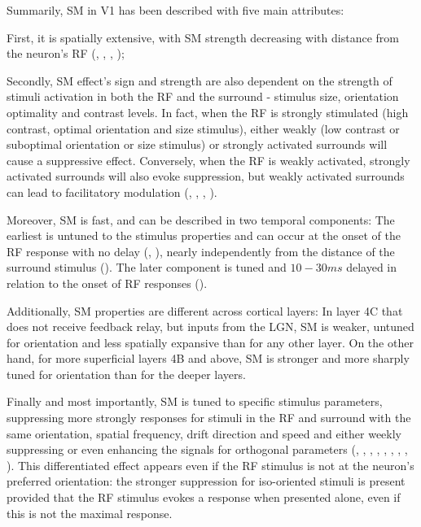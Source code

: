 Summarily, SM in V1 has been described with five main attributes: 

First, it is spatially extensive, with SM strength decreasing with distance from the neuron's RF (\cite{Sceniak2001}, \cite{Cavanaugh2002a}, \cite{Levitt2002}, \cite{Shushruth2009});

Secondly, SM effect's sign and strength are also dependent on the strength of stimuli activation in both the RF and the surround - stimulus size, orientation optimality and contrast levels. In fact, when the RF is strongly stimulated (high contrast, optimal orientation and size stimulus), either weakly (low contrast or suboptimal orientation or size stimulus) or strongly activated surrounds will cause a suppressive effect. Conversely, when the RF is weakly activated, strongly activated surrounds will also evoke suppression, but weakly activated surrounds can lead to facilitatory modulation (\cite{Polat1998}, \cite{Chen2001}, \cite{Ichida2007}, \cite{Shushruth2012}).

Moreover, SM is fast, and can be described in two temporal components: The earliest is untuned to the stimulus properties and can occur at the onset of the RF response with no delay (\cite{Muller2003}, \cite{Henry2013}), nearly independently from the distance of the surround stimulus (\cite{Bair2003}). The later component is tuned and $10-30 ms$ delayed in relation to the onset of RF responses (\cite{Bair2003}).

Additionally, SM properties are different across cortical layers: In layer 4C that does not receive feedback relay, but inputs from the LGN, SM is weaker, untuned for orientation and less spatially expansive than for any other layer. On the other hand, for more superficial layers 4B and above, SM is stronger and more sharply tuned for orientation than for the deeper layers.

Finally and most importantly, SM is tuned to specific stimulus parameters, suppressing more strongly responses for stimuli in the RF and surround with the same orientation, spatial frequency, drift direction and speed and either weekly suppressing or even enhancing the signals for orthogonal parameters (\cite{deAngelis1994}, \cite{Li1994}, \cite{Sengpiel1997}, \cite{Walker1999}, \cite{Cavanaugh2002a}, \cite{Muller2003}, \cite{Webb2005}, \cite{Henry2013}, \cite{Self2014}). This differentiated effect appears even if the RF stimulus is not at the neuron's preferred orientation: the stronger suppression for iso-oriented stimuli is present provided that the RF stimulus evokes a response when presented alone, even if this is not the maximal response.

